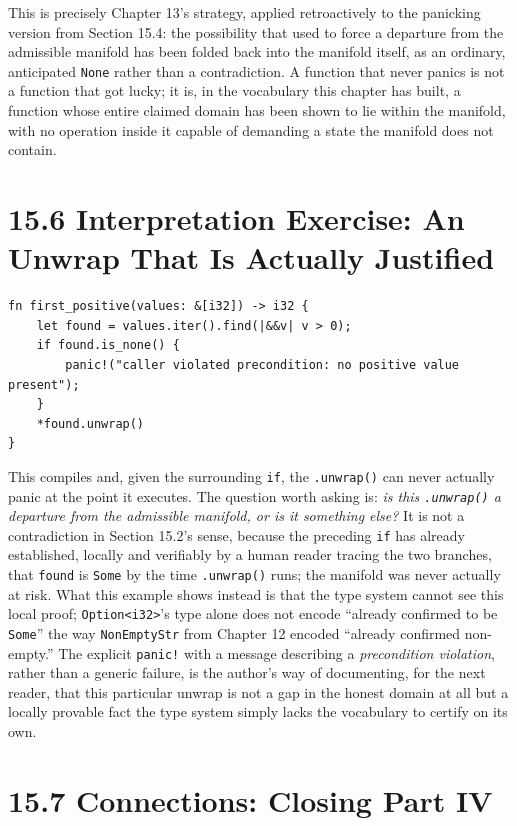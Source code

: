 \documentclass[11pt]{book}
\begin{document}
This is precisely Chapter 13's strategy, applied retroactively to the panicking version from Section 15.4: the possibility that used to force a departure from the admissible manifold has been folded back into the manifold itself, as an ordinary, anticipated \texttt{None} rather than a contradiction. A function that never panics is not a function that got lucky; it is, in the vocabulary this chapter has built, a function whose entire claimed domain has been shown to lie within the manifold, with no operation inside it capable of demanding a state the manifold does not contain.

\section*{15.6 Interpretation Exercise: An Unwrap That Is Actually Justified}

\begin{lstlisting}
fn first_positive(values: &[i32]) -> i32 {
    let found = values.iter().find(|&&v| v > 0);
    if found.is_none() {
        panic!("caller violated precondition: no positive value present");
    }
    *found.unwrap()
}
\end{lstlisting}

This compiles and, given the surrounding \texttt{if}, the \texttt{.unwrap()} can never actually panic at the point it executes. The question worth asking is: \emph{is this \texttt{.unwrap()} a departure from the admissible manifold, or is it something else?} It is not a contradiction in Section 15.2's sense, because the preceding \texttt{if} has already established, locally and verifiably by a human reader tracing the two branches, that \texttt{found} is \texttt{Some} by the time \texttt{.unwrap()} runs; the manifold was never actually at risk. What this example shows instead is that the type system cannot see this local proof; \texttt{Option<i32>}'s type alone does not encode ``already confirmed to be \texttt{Some}'' the way \texttt{NonEmptyStr} from Chapter 12 encoded ``already confirmed non-empty.'' The explicit \texttt{panic!} with a message describing a \emph{precondition violation}, rather than a generic failure, is the author's way of documenting, for the next reader, that this particular unwrap is not a gap in the honest domain at all but a locally provable fact the type system simply lacks the vocabulary to certify on its own.

\section*{15.7 Connections: Closing Part IV}
\end{document}
